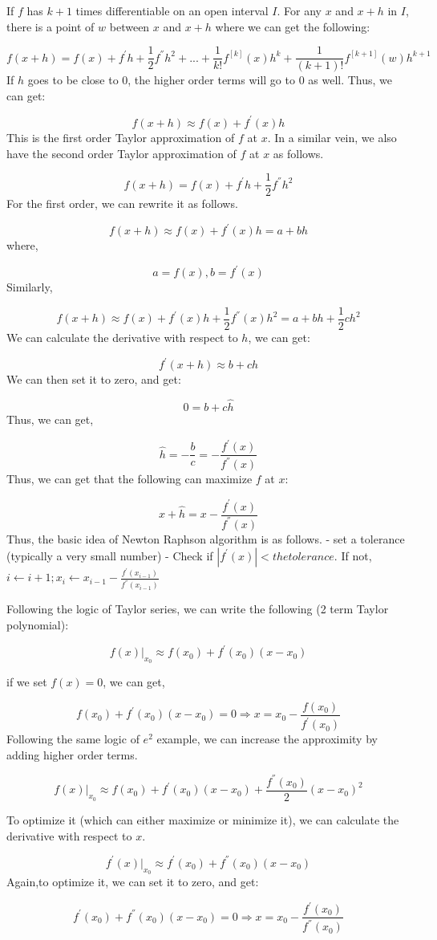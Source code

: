 \documentclass[]{book}
\begin{document}
If \(f\) has \(k+1\) times differentiable on an open interval \(I\). For
any \(x\) and \(x+h\) in \(I\), there is a point of \(w\) between \(x\)
and \(x+h\) where we can get the following:

\[f(x+h)=f(x)+f^{'}h+\frac{1}{2}f^{''}h^2+...+\frac{1}{k!}f^{[k]}(x)h^k+\frac{1}{(k+1)!}f^{[k+1]}(w)h^{k+1}\]
If \(h\) goes to be close to \(0\), the higher order terms will go to
\(0\) as well. Thus, we can get:

\[f(x+h) \approx f(x)+f^{'}(x)h \] This is the first order Taylor
approximation of \(f\) at \(x\). In a similar vein, we also have the
second order Taylor approximation of \(f\) at \(x\) as follows.

\[f(x+h)=f(x)+f^{'}h+\frac{1}{2}f^{''}h^2\] For the first order, we can
rewrite it as follows.

\[f(x+h) \approx f(x)+f^{'}(x)h = a+bh\] where,

\[ a = f(x), b=f^{'}(x)\] Similarly,

\[f(x+h)\approx f(x)+f^{'}(x)h+\frac{1}{2}f^{''}(x)h^2=a+bh+\frac{1}{2}ch^2\]
We can calculate the derivative with respect to \(h\), we can get:

\[f^{'}(x+h) \approx b+ch\] We can then set it to zero, and get:

\[0=b+c \hat{h}\] Thus, we can get,

\[\hat{h} = -\frac{b}{c}=-\frac{f^{'}(x)}{f^{''}(x)}\] Thus, we can get
that the following can maximize \(f\) at \(x\):

\[x+\hat{h}=x-\frac{f^{'}(x)}{f^{''}(x)}\] Thus, the basic idea of
Newton Raphson algorithm is as follows. - set a tolerance (typically a
very small number) - Check if \(|f^{'}(x)|< the tolerance\). If not,
\(i \leftarrow i+1; x_i\leftarrow x_{i-1}-\frac{f^{'}(x_{i-1})}{f^{''}(x_{i-1})}\)

Following the logic of Taylor series, we can write the following (2 term
Taylor polynomial):

\[f(x)|_{x_0} \approx f(x_0) + f^{'}(x_0)(x-x_0)\]

if we set \(f(x)=0\), we can get,

\[f(x_0) + f^{'}(x_0)(x-x_0)=0 \Rightarrow x= x_0 - \frac{f(x_0)}{f^{'}(x_0)}\]
Following the same logic of \(e^2\) example, we can increase the
approximity by adding higher order terms.

\[f(x)|_{x_0} \approx f(x_0) + f^{'}(x_0)(x-x_0)+\frac{f^{''}(x_0)}{2}(x-x_0)^2\]

To optimize it (which can either maximize or minimize it), we can
calculate the derivative with respect to \(x\).

\[f^{'}(x)|_{x_0} \approx  f^{'}(x_0)+f^{''}(x_0)(x-x_0)\] Again,to
optimize it, we can set it to zero, and get:

\[f^{'}(x_0)+f^{''}(x_0)(x-x_0)=0 \Rightarrow x=x_0 - \frac{f^{'}(x_0)}{f^{''}(x_0)}\]


\end{document}
